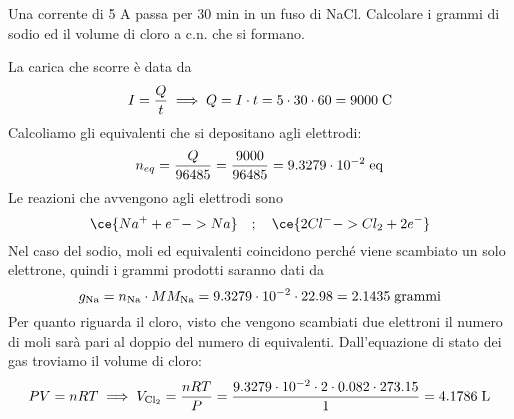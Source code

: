 \newpage

\begin{esercizio}
    Una corrente di 5 A passa per 30 min in un fuso di NaCl. Calcolare i grammi di sodio ed il volume di cloro a c.n. che si formano.
\end{esercizio}
\begin{soluzione}
    La carica che scorre è data da
    \begin{equation*}
        I=\frac{Q}{t}
        \implies
        Q=I \cdot t
        =5 \cdot 30 \cdot 60
        =9000 \; \rm C
    \end{equation*}
    Calcoliamo gli equivalenti che si depositano agli elettrodi:
    \begin{equation*}
        n_{eq}=\frac{Q}{96485}
        =\frac{9000}{96485}
        =9.3279 \cdot 10^{-2} \; \rm eq
    \end{equation*}
    Le reazioni che avvengono agli elettrodi sono
    \begin{equation*}
        \ce{Na^+ + e^- -> Na}
        \quad;\quad
        \ce{2Cl^- -> Cl_2 + 2e^-}
    \end{equation*}
    Nel caso del sodio, moli ed equivalenti coincidono perché viene scambiato un solo elettrone, quindi i grammi prodotti saranno dati da
    \begin{equation*}
        g_{\rm Na}=n_{\rm Na} \cdot MM_{\rm Na}
        =9.3279 \cdot 10^{-2} \cdot 22.98
        =2.1435 \; \rm grammi
    \end{equation*}
    Per quanto riguarda il cloro, visto che vengono scambiati due elettroni il numero di moli sarà pari al doppio del numero di equivalenti. Dall'equazione di stato dei gas troviamo il volume di cloro:
    \begin{equation*}
        PV=nRT
        \implies
        V_{\rm Cl_2}=\frac{nRT}{P}
        =\frac{9.3279 \cdot 10^{-2} \cdot 2 \cdot 0.082 \cdot 273.15}{1}
        =4.1786 \; \rm L
    \end{equation*}
\end{soluzione}

\newpage


